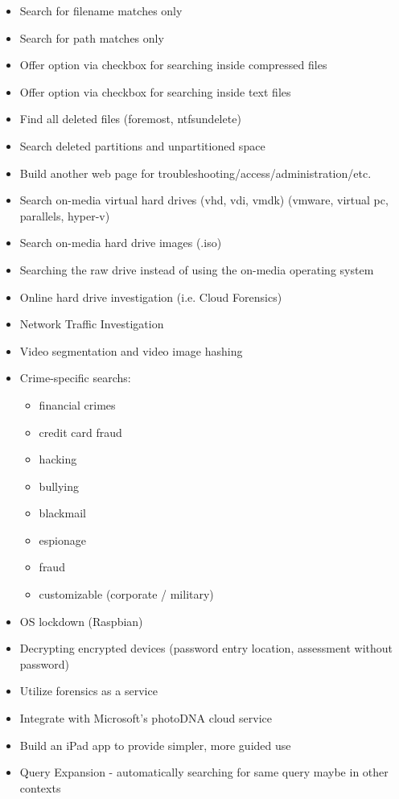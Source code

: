 \documentclass[12pt]{article}
\begin{document}
{\begin{itemize}
  \item Search for filename matches only
  \item Search for path matches only
  \item Offer option via checkbox for searching inside compressed files
  \item Offer option via checkbox for searching inside text files
  \item Find all deleted files (foremost, ntfsundelete)
  \item Search deleted partitions and unpartitioned space
  \item Build another web page for troubleshooting/access/administration/etc.
  \item Search on-media virtual hard drives (vhd, vdi, vmdk) (vmware, virtual pc, parallels, hyper-v)
  \item Search on-media hard drive images (.iso)
  \item Searching the raw drive instead of using the on-media operating system
  \item Online hard drive investigation (i.e. Cloud Forensics)
  \item Network Traffic Investigation
  \item Video segmentation and video image hashing
  \item Crime-specific searchs:
  \begin{itemize}
    \item financial crimes
    \item credit card fraud
    \item hacking
    \item bullying
    \item blackmail
    \item espionage
    \item fraud
    \item customizable (corporate / military)
  \end{itemize}
  \item OS lockdown (Raspbian)
  \item Decrypting encrypted devices (password entry location, assessment without password)
  \item Utilize forensics as a service
  \item Integrate with Microsoft's photoDNA cloud service
  \item Build an iPad app to provide simpler, more guided use
  \item Query Expansion - automatically searching for same query maybe in other contexts

\end{itemize}}
\end{document}
